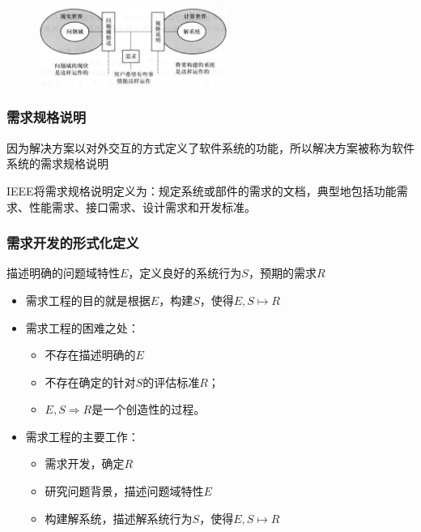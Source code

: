 \begin{figure}[H]
	\centering
	\includegraphics[width=0.55\textwidth]{img/问题域、需求、解系统、需求规格说明关系示意图.png}
\end{figure}

\subsubsection{需求规格说明}
因为解决方案以对外交互的方式定义了软件系统的功能，所以解决方案被称为软件系统的需求规格说明

IEEE将需求规格说明定义为：规定系统或部件的需求的文档，典型地包括功能需求、性能需求、接口需求、设计需求和开发标准。

\subsubsection{需求开发的形式化定义}
描述明确的问题域特性$E$，定义良好的系统行为$S$，预期的需求$R$
\begin{itemize}
    \item 需求工程的目的就是根据$E$，构建$S$，使得$E,S\mapsto R$
    \item 需求工程的困难之处：
    \begin{itemize}
        \item 不存在描述明确的$E$
        \item 不存在确定的针对$S$的评估标准$R$；
        \item $E,S \Rightarrow R$是一个创造性的过程。
    \end{itemize}
    \item 需求工程的主要工作：
    \begin{itemize}
        \item 需求开发，确定$R$
        \item 研究问题背景，描述问题域特性$E$
        \item 构建解系统，描述解系统行为$S$，使得$E,S\mapsto R$
    \end{itemize}
\end{itemize}

